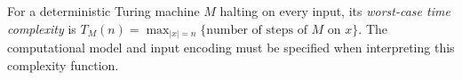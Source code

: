 
For a deterministic Turing machine $M$ halting on every input, its \emph{worst-case time complexity} is $T_M(n)=\max_{\lvert x\rvert=n}\{\text{number of steps of }M\text{ on }x\}$. The computational model and input encoding must be specified when interpreting this complexity function.

